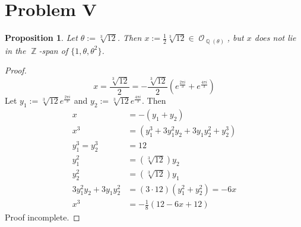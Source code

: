 \documentclass{article}
\newtheorem{proposition}[theorem]{Proposition}
\DeclareMathOperator{\Z}{\mathbb{Z}}
\DeclareMathOperator{\Q}{\mathbb{Q}}
\DeclareMathOperator{\scrO}{\mathscr{O}}
\begin{document}
\section{Problem V}
\begin{proposition}
	Let $\theta:=\sqrt[3]{12}$.  Then $x:=\frac{1}{2}\sqrt[3]{12}\in\scrO_{\Q(\theta)}$, but $x$ does not lie in the $\Z$-span of $\{1,\theta,\theta^2\}$.
\end{proposition}
\begin{proof}
	\begin{equation*}
	x = \frac{\sqrt[3]{12}}{2} = -\frac{\sqrt[3]{12}}{2}(e^{\frac{2\pi i}{3}}+e^{\frac{4\pi i}{3}})
	\end{equation*}
	Let $y_1 := \sqrt[3]{12}e^{\frac{2\pi i}{3}}$ and $y_2 := \sqrt[3]{12}e^{\frac{4\pi i}{3}}$.  Then
	\begin{align*}
	x &= -(y_1+y_2)\\
	x^3 &=(y_1^3+3y_1^{2}y_2+3y_1y_2^2+y_2^3)\\
	y_1^3 = y_2^3 &= 12\\
	y_1^2 &= (\sqrt[3]{12})y_2\\
	y_2^2 &= (\sqrt[3]{12})y_1\\
	3y_1^{2}y_2+3y_1y_2^2 &= (3\cdot{12})(y_1^2+y_2^2) = -6x\\
	x^3 &= -\frac{1}{8}(12-6x+12)
	\end{align*}
	Proof incomplete.
\end{proof}
\end{document}
